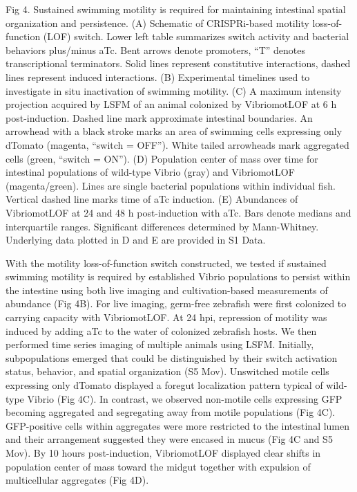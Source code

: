 Fig 4. Sustained swimming motility is required for maintaining intestinal spatial organization and persistence. 
(A) Schematic of CRISPRi-based motility loss-of-function (LOF) switch. Lower left table summarizes switch activity and bacterial behaviors plus/minus aTc. Bent arrows denote promoters, ``T'' denotes transcriptional terminators. Solid lines represent constitutive interactions, dashed lines represent induced interactions. (B) Experimental timelines used to investigate in situ inactivation of swimming motility. (C) A maximum intensity projection acquired by LSFM of an animal colonized by VibriomotLOF at 6 h post-induction. Dashed line mark approximate intestinal boundaries. An arrowhead with a black stroke marks an area of swimming cells expressing only dTomato (magenta, ``switch = OFF''). White tailed arrowheads mark aggregated cells (green, ``switch = ON''). (D) Population center of mass over time for intestinal populations of wild-type Vibrio (gray) and VibriomotLOF (magenta/green). Lines are single bacterial populations within individual fish. Vertical dashed line marks time of aTc induction. (E) Abundances of VibriomotLOF at 24 and 48 h post-induction with aTc. Bars denote medians and interquartile ranges. Significant differences determined by Mann-Whitney. Underlying data plotted in D and E are provided in S1 Data.

With the motility loss-of-function switch constructed, we tested if sustained swimming motility is required by established Vibrio populations to persist within the intestine using both live imaging and cultivation-based measurements of abundance (Fig 4B). For live imaging, germ-free zebrafish were first colonized to carrying capacity with VibriomotLOF. At 24 hpi, repression of motility was induced by adding aTc to the water of colonized zebrafish hosts. We then performed time series imaging of multiple animals using LSFM. Initially, subpopulations emerged that could be distinguished by their switch activation status, behavior, and spatial organization (S5 Mov). Unswitched motile cells expressing only dTomato displayed a foregut localization pattern typical of wild-type Vibrio (Fig 4C). In contrast, we observed non-motile cells expressing GFP becoming aggregated and segregating away from motile populations (Fig 4C). GFP-positive cells within aggregates were more restricted to the intestinal lumen and their arrangement suggested they were encased in mucus (Fig 4C and S5 Mov). By 10 hours post-induction, VibriomotLOF displayed clear shifts in population center of mass toward the midgut together with expulsion of multicellular aggregates (Fig 4D).

